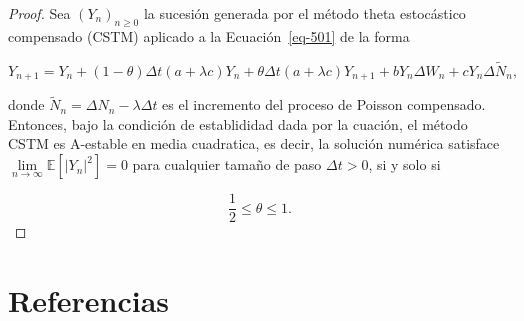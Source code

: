 \documentclass[
  spanish,
  us-letterpaper,
]{scrreprt}
\theoremstyle{plain}
\theoremstyle{plain}
\theoremstyle{plain}
\theoremstyle{definition}
\theoremstyle{remark}
\begin{document}
\begin{proof}
Sea \((Y_n)_{n\geq 0}\) la sucesión generada por el método theta
estocástico compensado (CSTM) aplicado a la Ecuación~\ref{eq-501} de la
forma

\[
    Y_{n+1}=Y_n+(1-\theta)\Delta t(a+\lambda c)Y_n+\theta \Delta t(a+\lambda c) Y_{n+1}+bY_n\Delta W_n+cY_n\Delta \widetilde{N}_n,
\]

donde \(\widetilde{N}_n=\Delta N_n-\lambda\Delta t\) es el incremento
del proceso de Poisson compensado. Entonces, bajo la condición de
establididad dada por la cuación, el método CSTM es A-estable en media
cuadratica, es decir, la solución numérica satisface
\(\displaystyle \lim\limits_{n\rightarrow\infty}\mathbb{E}[|Y_n|^2]=0\)
para cualquier tamaño de paso \(\Delta t>0\), si y solo si

\[
    \frac{1}{2}\leq \theta\leq 1.
\]
\end{proof}


\chapter{Referencias}\label{referencias}
\end{document}
